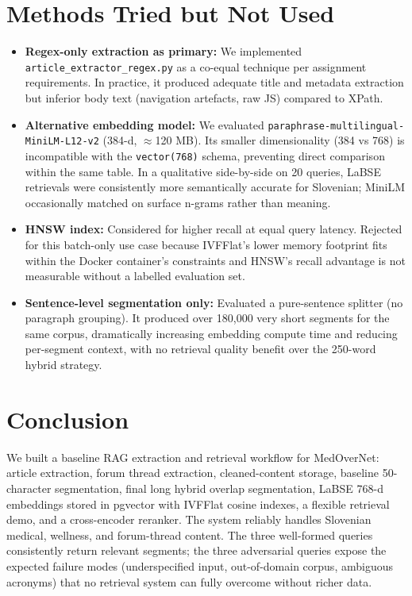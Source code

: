 \documentclass[9pt]{IEEEtran}
\begin{document}
\section{Methods Tried but Not Used}
\begin{itemize}
    \item \textbf{Regex-only extraction as primary:} We implemented \texttt{article\_extractor\_regex.py} as a co-equal technique per assignment requirements.
    In practice, it produced adequate title and metadata extraction but inferior body text (navigation artefacts, raw JS) compared to XPath.
    \item \textbf{Alternative embedding model:} We evaluated \texttt{paraphrase-multilingual-MiniLM-L12-v2} (384-d, $\approx$120 MB). Its smaller dimensionality (384 vs 768) is incompatible with the \texttt{vector(768)} schema,
    preventing direct comparison within the same table. In a qualitative side-by-side on 20 queries, LaBSE retrievals were consistently more semantically accurate for Slovenian; MiniLM occasionally matched on surface n-grams rather than meaning.
    \item \textbf{HNSW index:} Considered for higher recall at equal query latency. Rejected for this batch-only use case because IVFFlat's lower memory footprint fits within the Docker container's constraints
    and HNSW's recall advantage is not measurable without a labelled evaluation set.
    \item \textbf{Sentence-level segmentation only:} Evaluated a pure-sentence splitter (no paragraph grouping). It produced over 180,000 very short segments for the same corpus,
    dramatically increasing embedding compute time and reducing per-segment context, with no retrieval quality benefit over the 250-word hybrid strategy.
\end{itemize}

\section{Conclusion}
We built a baseline RAG extraction and retrieval workflow for MedOverNet: article extraction, forum thread extraction, cleaned-content storage, baseline 50-character segmentation,
final long hybrid overlap segmentation, LaBSE 768-d embeddings stored in pgvector with IVFFlat cosine indexes, a flexible retrieval demo, and a cross-encoder reranker.
The system reliably handles Slovenian medical, wellness, and forum-thread content. The three well-formed queries consistently return relevant segments;
the three adversarial queries expose the expected failure modes (underspecified input, out-of-domain corpus, ambiguous acronyms) that no retrieval system can fully overcome without richer data.
\end{document}
